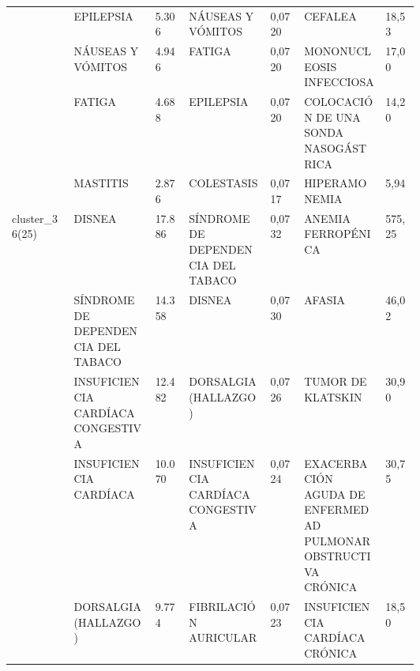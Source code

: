 \begin{landscape}
\begin{longtable}[c]{@{}lp{0.2\linewidth}lp{0.2\linewidth}lp{0.2\linewidth}l@{}}
                                  & EPILEPSIA                                                     & 5.306  & NÁUSEAS Y VÓMITOS                                      & 0,0720 & CEFALEA                                                       & 18,53    \\
                                  & NÁUSEAS Y VÓMITOS                                             & 4.946  & FATIGA                                                 & 0,0720 & MONONUCLEOSIS INFECCIOSA                                      & 17,00    \\
                                  & FATIGA                                                        & 4.688  & EPILEPSIA                                              & 0,0720 & COLOCACIÓN DE UNA SONDA NASOGÁSTRICA                          & 14,20    \\
                                  & MASTITIS                                                      & 2.876  & COLESTASIS                                             & 0,0717 & HIPERAMONEMIA                                                 & 5,94     \\
\multirow{10}{*}{cluster\_36(25)} & DISNEA                                                        & 17.886 & SÍNDROME DE DEPENDENCIA DEL TABACO                     & 0,0732 & ANEMIA FERROPÉNICA                                            & 575,25   \\
                                  & SÍNDROME DE DEPENDENCIA DEL TABACO                            & 14.358 & DISNEA                                                 & 0,0730 & AFASIA                                                        & 46,02    \\
                                  & INSUFICIENCIA CARDÍACA CONGESTIVA                             & 12.482 & DORSALGIA (HALLAZGO)                                   & 0,0726 & TUMOR DE KLATSKIN                                             & 30,90    \\
                                  & INSUFICIENCIA CARDÍACA                                        & 10.070 & INSUFICIENCIA CARDÍACA CONGESTIVA                      & 0,0724 & EXACERBACIÓN AGUDA DE ENFERMEDAD PULMONAR OBSTRUCTIVA CRÓNICA & 30,75    \\
                                  & DORSALGIA (HALLAZGO)                                          & 9.774  & FIBRILACIÓN AURICULAR                                  & 0,0723 & INSUFICIENCIA CARDÍACA CRÓNICA                                & 18,50    \\

\end{longtable}
\end{landscape}
